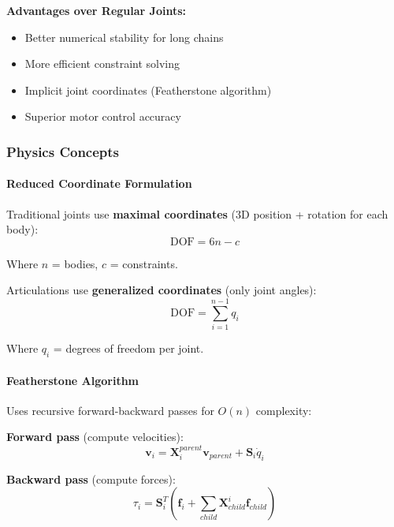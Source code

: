 \textbf{Advantages over Regular Joints:}
\begin{itemize}
    \item Better numerical stability for long chains
    \item More efficient constraint solving
    \item Implicit joint coordinates (Featherstone algorithm)
    \item Superior motor control accuracy
\end{itemize}

\subsubsection{Physics Concepts}

\paragraph{Reduced Coordinate Formulation}

Traditional joints use \textbf{maximal coordinates} (3D position + rotation for each body):
\begin{equation}
\text{DOF} = 6n - c
\end{equation}

Where $n$ = bodies, $c$ = constraints.

Articulations use \textbf{generalized coordinates} (only joint angles):
\begin{equation}
\text{DOF} = \sum_{i=1}^{n-1} q_i
\end{equation}

Where $q_i$ = degrees of freedom per joint.

\paragraph{Featherstone Algorithm}

Uses recursive forward-backward passes for $O(n)$ complexity:

\textbf{Forward pass} (compute velocities):
\begin{equation}
\mathbf{v}_i = \mathbf{X}_i^{parent} \mathbf{v}_{parent} + \mathbf{S}_i \dot{q}_i
\end{equation}

\textbf{Backward pass} (compute forces):
\begin{equation}
\tau_i = \mathbf{S}_i^T (\mathbf{f}_i + \sum_{child} \mathbf{X}_{child}^i \mathbf{f}_{child})
\end{equation}

